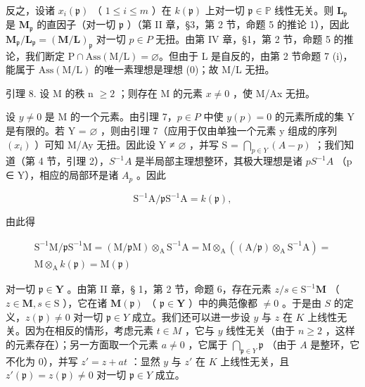 反之，设诸 \(x_{i}(\mathfrak{p})\) （ \(1 \leqslant i \leqslant m\) ）在 \(k(\mathfrak{p})\) 上对一切 \(\mathfrak{p} \in \mathbb{P}\) 线性无关。则 \(\mathbf{L}_{\mathfrak{p}}\) 是 \(\mathbf{M}_{\mathfrak{p}}\) 的直因子（对一切 \(\mathfrak{p}\) ）（第 II 章，§3，第 2 节，命题 5 的推论 1），因此 \(\mathbf{M}_{\mathfrak{p}} / \mathbf{L}_{\mathfrak{p}} = (\mathbf{M} / \mathbf{L})_{\mathfrak{p}}\) 对一切 \(p \in P\) 无扭。由第 IV 章，§1，第 2 节，命题 5 的推论，我们断定 \(\mathrm{P} \cap \mathrm{Ass}(\mathrm{M}/\mathrm{L}) = \varnothing\)。但由于 L 是自反的，由第 2 节命题 7 (i)，能属于 \(\mathrm{Ass}(\mathrm{M}/\mathrm{L})\) 的唯一素理想是理想 (0)；故 M/L 无扭。

引理 8. 设 M 的秩 n \(\geqslant2\) ；则存在 M 的元素 \(x \neq 0\) ，使 M/Ax 无扭。

设 \(y \neq 0\) 是 M 的一个元素。由引理 7，\(p \in P\) 中使 \(y(p) = 0\) 的元素所成的集 Y 是有限的。若 Y = \(\varnothing\) ，则由引理 7（应用于仅由单独一个元素 y 组成的序列 \((x_i)\) ）可知 M/Ay 无扭。因此设 Y ≠ \(\varnothing\) ，并写 S = \(\bigcap_{p \in Y} (A - p)\) ；我们知道（第 4 节，引理 2），\(S^{-1}A\) 是半局部主理想整环，其极大理想是诸 \(pS^{-1}A\) （p ∈ Y），相应的局部环是诸 \(A_{p}\) 。因此

\[
\mathrm{S} ^ {- 1} \mathrm{A} / \mathfrak {p} \mathrm{S} ^ {- 1} \mathrm{A} = k (\mathfrak {p}),
\]

由此得

\[
\begin{array}{c} \mathrm{S} ^ {- 1} \mathrm{M} / \mathfrak {p} \mathrm{S} ^ {- 1} \mathrm{M} = (\mathrm{M} / \mathfrak {p} \mathrm{M}) \otimes_ {\mathrm{A}} \mathrm{S} ^ {- 1} \mathrm{A} = \mathrm{M} \otimes_ {\mathrm{A}} ((\mathrm{A} / \mathfrak {p}) \otimes_ {\mathrm{A}} \mathrm{S} ^ {- 1} \mathrm{A}) = \\ \mathrm{M} \otimes_ {\mathrm{A}} k (\mathfrak {p}) = \mathrm{M} (\mathfrak {p}) \end{array}
\]

对一切 \(\mathfrak{p} \in \mathbf{Y}\) 。由第 II 章，§ 1，第 2 节，命题 6，存在元素 \(z / s \in \mathrm{S}^{-1}\mathbf{M}\) （ \(z \in \mathbf{M}, s \in \mathrm{S}\) ），它在诸 \(\mathbf{M}(\mathfrak{p})\) （ \(\mathfrak{p} \in \mathbf{Y}\) ）中的典范像都 \(\neq 0\) 。于是由 \(S\) 的定义，\(z(\mathfrak{p}) \neq 0\) 对一切 \(\mathfrak{p} \in Y\) 成立。我们还可以进一步设 \(y\) 与 \(z\) 在 \(K\) 上线性无关。因为在相反的情形，考虑元素 \(t \in M\) ，它与 \(y\) 线性无关（由于 \(n \geqslant 2\) ，这样的元素存在）；另一方面取一个元素 \(a \neq 0\) ，它属于 \(\bigcap_{\mathfrak{p} \in Y} \mathfrak{p}\) （由于 \(A\) 是整环，它不化为 0），并写 \(z' = z + at\) ：显然 \(y\) 与 \(z'\) 在 \(K\) 上线性无关，且 \(z'(\mathfrak{p}) = z(\mathfrak{p}) \neq 0\) 对一切 \(\mathfrak{p} \in Y\) 成立。

